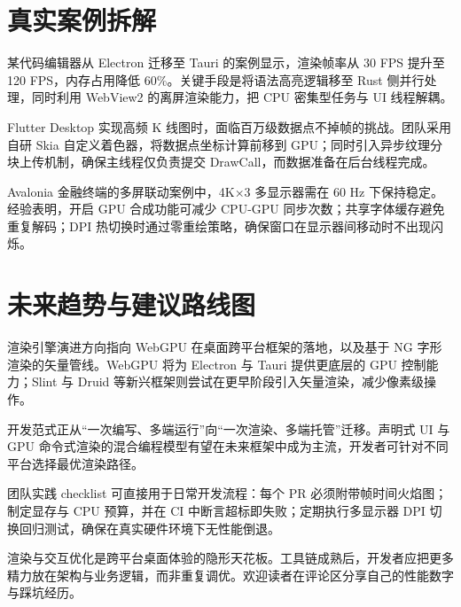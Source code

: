 \chapter{真实案例拆解}
某代码编辑器从 Electron 迁移至 Tauri 的案例显示，渲染帧率从 30 FPS 提升至 120 FPS，内存占用降低 60\%{}。关键手段是将语法高亮逻辑移至 Rust 侧并行处理，同时利用 WebView2 的离屏渲染能力，把 CPU 密集型任务与 UI 线程解耦。\par
Flutter Desktop 实现高频 K 线图时，面临百万级数据点不掉帧的挑战。团队采用自研 Skia 自定义着色器，将数据点坐标计算前移到 GPU；同时引入异步纹理分块上传机制，确保主线程仅负责提交 DrawCall，而数据准备在后台线程完成。\par
Avalonia 金融终端的多屏联动案例中，4K×3 多显示器需在 60 Hz 下保持稳定。经验表明，开启 GPU 合成功能可减少 CPU-GPU 同步次数；共享字体缓存避免重复解码；DPI 热切换时通过零重绘策略，确保窗口在显示器间移动时不出现闪烁。\par
\chapter{未来趋势与建议路线图}
渲染引擎演进方向指向 WebGPU 在桌面跨平台框架的落地，以及基于 NG 字形渲染的矢量管线。WebGPU 将为 Electron 与 Tauri 提供更底层的 GPU 控制能力；Slint 与 Druid 等新兴框架则尝试在更早阶段引入矢量渲染，减少像素级操作。\par
开发范式正从“一次编写、多端运行”向“一次渲染、多端托管”迁移。声明式 UI 与 GPU 命令式渲染的混合编程模型有望在未来框架中成为主流，开发者可针对不同平台选择最优渲染路径。\par
团队实践 checklist 可直接用于日常开发流程：每个 PR 必须附带帧时间火焰图；制定显存与 CPU 预算，并在 CI 中断言超标即失败；定期执行多显示器 DPI 切换回归测试，确保在真实硬件环境下无性能倒退。\par
渲染与交互优化是跨平台桌面体验的隐形天花板。工具链成熟后，开发者应把更多精力放在架构与业务逻辑，而非重复调优。欢迎读者在评论区分享自己的性能数字与踩坑经历。\par
